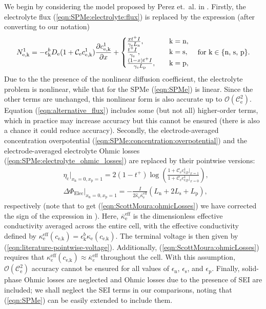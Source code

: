 \documentclass[a4paper]{article}
\newcommand{\ts}[1]{_{\text{#1}}}
\newcommand{\kin}[1]{\text{k} \in \{\text{#1}\}}
\newcommand{\mybar}{\overline}
\begin{document}
We begin by considering the model proposed by Perez et.~al. in \cite{Perez2016}. Firstly, the electrolyte flux (\ref{eqn:SPMe:electrolyte:flux}) is replaced by the expression (after converting to our notation)
\begin{equation}\label{eqn:alternative_flux}
  N\ts{e,k}^1 = -\epsilon\ts{k}^bD\ts{e}(1+\mathcal{C}\ts{e} c\ts{e,k}^1)\pdv{c\ts{e,k}^1}{x} + 
	\begin{cases} 
	  \frac{x t^+I}{\gamma\ts{e}L\ts{n}}, \quad &\text{k}=\text{n}, \\ 
     \frac{t^+I}{\gamma\ts{e}}, \quad &\text{k}=\text{s}, \\ 
	 \frac{(1-x)t^+ I}{\gamma\ts{e} L\ts{p}}, \quad &\text{k}=\text{p},
    \end{cases}
	\quad \text{for } \kin{n, s, p}.
\end{equation}
Due to the the presence of the nonlinear diffusion coefficient, the electrolyte problem is nonlinear, while that for the SPMe (\ref{eqn:SPMe}) is linear. Since the other terms are unchanged, this nonlinear form is also accurate up to $\mathcal{O}(\mathcal{C}\ts{e}^2)$. Equation (\ref{eqn:alternative_flux}) includes some (but not all) higher-order terms, which in practice may increase accuracy but this cannot be ensured (there is also a chance it could reduce accuracy). Secondly, the electrode-averaged concentration overpotential (\ref{eqn:SPMe:concentration:overpotential}) and the electrode-averaged electrolyte Ohmic losses (\ref{eqn:SPMe:electrolyte_ohmic_losses}) are replaced by their pointwise versions:
\begin{align}
    \label{eqn:ScottMoura:concentrationOverpotential}
	&\eta\ts{c}\big|_{x\ts{n}=0,x\ts{p}=1} = 2 (1-t^+)\log\left(\frac{1+\mathcal{C}\ts{e} c\ts{e,p}^1\big|_{x=1}}{1+\mathcal{C}\ts{e} c\ts{e,p}^1\big|_{x=0}} \right), \\
	&\Delta \Phi_{\text{Elec}}\big|_{x\ts{n}=0,x\ts{p}=1}  = -\frac{I}{2\hat{\kappa}\ts{e} \mybar{\kappa}\ts{e}^{\text{eff}}}\left(L\ts{n} + 2L\ts{s} + L\ts{p} \right), \label{eqn:ScottMoura:ohmicLosses}
\end{align}
respectively (note that to get (\ref{eqn:ScottMoura:ohmicLosses}) we have corrected the sign of the expression in \cite{Perez2016}). Here, $\mybar{\kappa}\ts{e}^{\text{eff}}$ is the dimensionless effective conductivity averaged across the entire cell, with the effective conductivity defined by $\kappa\ts{e}^{\text{eff}}(c\ts{e,k})=\epsilon\ts{k}^b\kappa\ts{e}(c\ts{e,k})$. The terminal voltage is then given by (\ref{eqn:literature-pointwise-voltage}). Additionally, (\ref{eqn:ScottMoura:ohmicLosses}) requires that $\kappa_e^{\text{eff}}(c\ts{e,k})\approx\mybar{\kappa}_e^{\text{eff}}$ throughout the cell. With this assumption, $\mathcal{O}(\mathcal{C}\ts{e}^2)$ accuracy cannot be ensured for all values of $\epsilon\ts{n}$, $\epsilon\ts{s}$, and $\epsilon\ts{p}$. Finally, solid-phase Ohmic losses are neglected and Ohmic losses due to the presence of SEI are included; we shall neglect the SEI terms in our comparisons, noting that (\ref{eqn:SPMe}) can be easily extended to include them.
\end{document}
